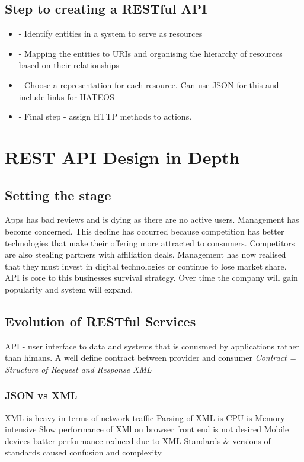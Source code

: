\documentclass[a4paper, 11pt]{book}
\begin{document}
    \subsection{Step to creating a RESTful API}
    \begin{itemize}
        \item - Identify entities in a system to serve as resources
        \item - Mapping the entities to URIs and organising the hierarchy of resources based on their relationships
        \item - Choose a representation for each resource. Can use JSON for this and include links for HATEOS
        \item - Final step - assign HTTP methods to actions.
    \end{itemize}

    \section{REST API Design in Depth}

    \subsection{Setting the stage}
    Apps has bad reviews and is dying as there are no active users.
    Management has become concerned.
    This decline has occurred because competition has better technologies that make their offering more attracted to consumers.
    Competitors are also stealing partners with affiliation deals.
    Management has now realised that they must invest in digital technologies or continue to lose market share.
    API is core to this businesses survival strategy.
    Over time the company will gain popularity and system will expand.

    \subsection{Evolution of RESTful Services}
    API - user interface to data and systems that is conusmed by applications rather than himans.
    A well define contract between provider and consumer
    \textit{Contract = Structure of Request and Response XML}

    \subsubsection{JSON vs XML}
    XML is heavy in terms of network traffic
    Parsing of XML is CPU is Memory intensive
    Slow performance of XMl on browser front end is not desired
    Mobile devices batter performance reduced due to XML
    Standards \& versions of standards caused confusion and complexity
\end{document}
